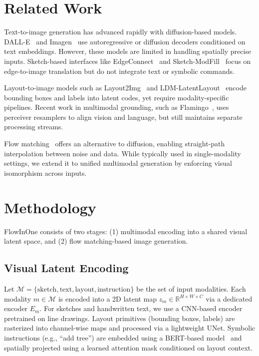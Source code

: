 \documentclass[11pt,a4paper]{article}
\begin{document}
\section{Related Work}
Text-to-image generation has advanced rapidly with diffusion-based models. DALL-E~\cite{ramesh2021zero} and Imagen~\cite{saharia2022photorealistic} use autoregressive or diffusion decoders conditioned on text embeddings. However, these models are limited in handling spatially precise inputs. Sketch-based interfaces like EdgeConnect~\cite{nazeri2019edgeconnect} and Sketch-ModFill~\cite{gu2022sketchmodfill} focus on edge-to-image translation but do not integrate text or symbolic commands.

Layout-to-image models such as Layout2Img~\cite{zhao2021layout2img} and LDM-LatentLayout~\cite{liu2023layout} encode bounding boxes and labels into latent codes, yet require modality-specific pipelines. Recent work in multimodal grounding, such as Flamingo~\cite{alayrac2022flamingo}, uses perceiver resamplers to align vision and language, but still maintains separate processing streams.

Flow matching~\cite{lipman2023flow} offers an alternative to diffusion, enabling straight-path interpolation between noise and data. While typically used in single-modality settings, we extend it to unified multimodal generation by enforcing visual isomorphism across inputs.

\section{Methodology}
FlowInOne consists of two stages: (1) multimodal encoding into a shared visual latent space, and (2) flow matching-based image generation.

\subsection{Visual Latent Encoding}
Let $\mathcal{M} = \{\text{sketch}, \text{text}, \text{layout}, \text{instruction}\}$ be the set of input modalities. Each modality $m \in \mathcal{M}$ is encoded into a 2D latent map $z_m \in \mathbb{R}^{H \times W \times C}$ via a dedicated encoder $E_m$. For sketches and handwritten text, we use a CNN-based encoder pretrained on line drawings. Layout primitives (bounding boxes, labels) are rasterized into channel-wise maps and processed via a lightweight UNet. Symbolic instructions (e.g., “add tree”) are embedded using a BERT-based model~\cite{devlin2019bert} and spatially projected using a learned attention mask conditioned on layout context.
\end{document}
